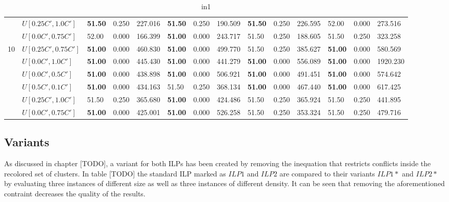 \begin{table}[h]
{\begin{tabular}{|l|l||l|l|l||l|l|l||l|l|l||l|l|l|}
       & $U[0.25C',1.0C']$ & \textbf{51.50} & 0.250 & 227.016 & \textbf{51.50} & 0.250 & 190.509 & \textbf{51.50} & 0.250 & 226.595 & 52.00 & 0.000 & 273.516 \\
       & $U[0.0C',0.75C']$ & 52.00 & 0.000 & 166.399 & \textbf{51.00} & 0.000 & 243.717 & 51.50 & 0.250 & 188.605 & 51.50 & 0.250 & 323.258 \\
      \hline\hline
      \multirow{6}{*}{10} & $U[0.25C',0.75C']$ & \textbf{51.00} & 0.000 & 460.830 & \textbf{51.00} & 0.000 & 499.770 & 51.50 & 0.250 & 385.627 & \textbf{51.00} & 0.000 & 580.569 \\
       & $U[0.0C',1.0C']$ & \textbf{51.00} & 0.000 & 445.430 & \textbf{51.00} & 0.000 & 441.279 & \textbf{51.00} & 0.000 & 556.089 & \textbf{51.00} & 0.000 & 1920.230 \\
       & $U[0.0C',0.5C']$ & \textbf{51.00} & 0.000 & 438.898 & \textbf{51.00} & 0.000 & 506.921 & \textbf{51.00} & 0.000 & 491.451 & \textbf{51.00} & 0.000 & 574.642 \\
       & $U[0.5C',0.1C']$ & \textbf{51.00} & 0.000 & 434.163 & 51.50 & 0.250 & 368.134 & \textbf{51.00} & 0.000 & 467.440 & \textbf{51.00} & 0.000 & 617.425 \\
       & $U[0.25C',1.0C']$ & 51.50 & 0.250 & 365.680 & \textbf{51.00} & 0.000 & 424.486 & 51.50 & 0.250 & 365.924 & 51.50 & 0.250 & 441.895 \\
       & $U[0.0C',0.75C']$ & \textbf{51.00} & 0.000 & 425.001 & \textbf{51.00} & 0.000 & 526.258 & 51.50 & 0.250 & 353.324 & 51.50 & 0.250 & 479.716 \\
      \hline
      \end{tabular}
      }
      \caption{in1}
      \label{tab:in1}\end{table}


\clearpage

\subsection{Variants}
As discussed in chapter [TODO], a variant for both ILPs has been created by removing the inequation that restricts conflicts inside the recolored set of clusters. In table [TODO] the standard ILP marked as $ILP1$ and $ILP2$ are compared to their variants $ILP1*$ and $ILP2*$ by evaluating three instances of different size as well as three instances of different density. It can be seen that removing the aforementioned contraint decreases the quality of the results.\\

